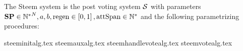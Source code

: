 \begin{definition}
  The Steem system is the post voting system $\mathcal{S}$ with parameters $\mathrm{\textbf{SP}}
  \in {\mathbb{N}^*}^N, a, b, \mathrm{regen} \in \left[0, 1\right],
  \mathrm{attSpan} \in \mathbb{N}^*$ and the following parametrizing procedures:
\end{definition}
{steeminitalg.tex}
{steemauxalg.tex}
{steemhandlevotealg.tex}
{steemvotealg.tex}
